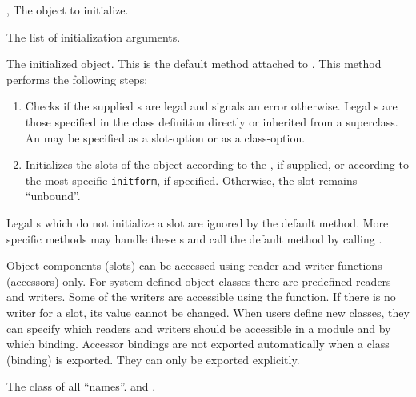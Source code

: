 \begin{optDefinition}
%
\begin{specargs}
    \item[\scref{object}, \classref{object}] The object to initialize.
    \item[\scref{initlist}] The list of initialization arguments.
\end{specargs}
%
\result%
The initialized object.
%
\remarks%
This is the default method attached to .  This method
performs the following steps:

\begin{enumerate}
    \item Checks if the supplied s are legal and signals an error
    otherwise. Legal s are those specified in the class
    definition directly or inherited from a superclass.  An  may
    be specified as a slot-option or as a class-option.

    \item Initializes the slots of the object according to the ,
    if supplied, or according to the most specific {\tt initform}, if specified.
    Otherwise, the slot remains ``unbound''.
\end{enumerate}
%
Legal s which do not initialize a slot are ignored by the default
 method.  More specific methods may handle these
s and call the default method by calling
.
%
%
\end{optDefinition}

%
\begin{optDefinition}
Object components (slots) can be accessed using reader and writer functions
(accessors) only. For system defined object classes there are predefined readers
and writers. Some of the writers are accessible using the 
function. If there is no writer for a slot, its value cannot be changed. When
users define new classes, they can specify which readers and writers should be
accessible in a module and by which binding.  Accessor bindings are not exported
automatically when a class (binding) is exported. They can only be exported
explicitly.

%
%
The class of all ``names''.
%
\seealso%
 and .
%
\end{optDefinition}
